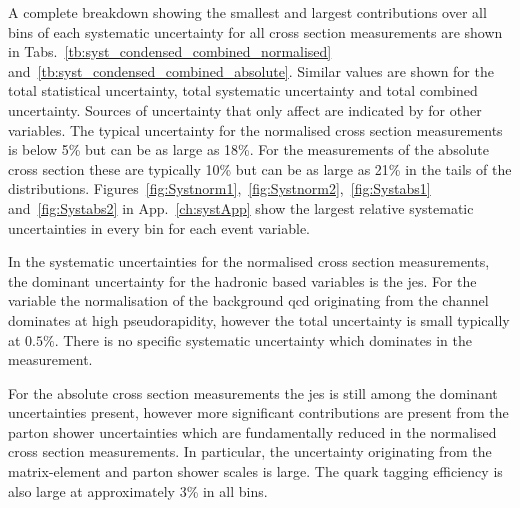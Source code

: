 A complete breakdown showing the smallest and largest contributions over all bins of each systematic uncertainty for all cross section measurements are shown in Tabs.~\ref{tb:syst_condensed_combined_normalised} and~\ref{tb:syst_condensed_combined_absolute}.
Similar values are shown for the total statistical uncertainty, total systematic uncertainty and total combined uncertainty.
Sources of uncertainty that only affect \ptmiss{} are indicated by \NA{} for other variables.
The typical uncertainty for the normalised cross section measurements is below 5\% but can be as large as 18\%.
For the measurements of the absolute cross section these are typically 10\% but can be as large as 21\% in the tails of the distributions.
Figures~\ref{fig:Systnorm1},~\ref{fig:Systnorm2},~\ref{fig:Systabs1} and~\ref{fig:Systabs2} in App.~\ref{ch:systApp} show the largest relative systematic uncertainties in every bin for each event variable.

In the systematic uncertainties for the normalised cross section measurements, the dominant uncertainty for the hadronic based variables is the \acrshort{jes}.
For the \LETA{} variable the normalisation of the background \acrshort{qcd} originating from the \eJets{} channel dominates at high pseudorapidity, however the total uncertainty is small typically at $0.5\%$.
There is no specific systematic uncertainty which dominates in the \LPT{} measurement.

For the absolute cross section measurements the \acrshort{jes} is still among the dominant uncertainties present, however more significant contributions are present from the parton shower uncertainties which are fundamentally reduced in the normalised cross section measurements.
In particular, the uncertainty originating from the matrix-element and parton shower scales is large.
The \bquark{} quark tagging efficiency is also large at approximately 3\% in all bins.



